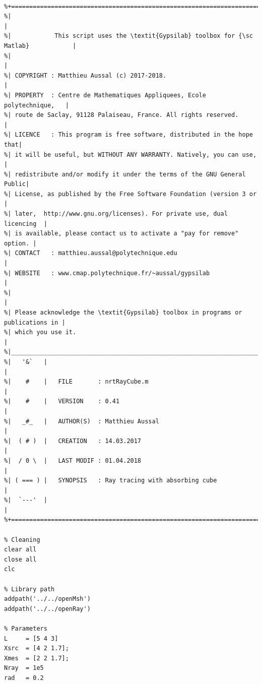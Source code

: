 \documentclass[AMA,STIX1COL]{WileyNJD-v2}
\begin{document}
\begin{lstlisting}[style=Matlab-editor,basicstyle=\footnotesize]

%+========================================================================+
%|                                                                        |
%|            This script uses the \textit{Gypsilab} toolbox for {\sc Matlab}            |
%|                                                                        |
%| COPYRIGHT : Matthieu Aussal (c) 2017-2018.                             |
%| PROPERTY  : Centre de Mathematiques Appliquees, Ecole polytechnique,   |
%| route de Saclay, 91128 Palaiseau, France. All rights reserved.         |
%| LICENCE   : This program is free software, distributed in the hope that|
%| it will be useful, but WITHOUT ANY WARRANTY. Natively, you can use,    |
%| redistribute and/or modify it under the terms of the GNU General Public|
%| License, as published by the Free Software Foundation (version 3 or    |
%| later,  http://www.gnu.org/licenses). For private use, dual licencing  |
%| is available, please contact us to activate a "pay for remove" option. |
%| CONTACT   : matthieu.aussal@polytechnique.edu                          |
%| WEBSITE   : www.cmap.polytechnique.fr/~aussal/gypsilab                 |
%|                                                                        |
%| Please acknowledge the \textit{Gypsilab} toolbox in programs or publications in |
%| which you use it.                                                      |
%|________________________________________________________________________|
%|   '&`   |                                                              |
%|    #    |   FILE       : nrtRayCube.m                                  |
%|    #    |   VERSION    : 0.41                                          |
%|   _#_   |   AUTHOR(S)  : Matthieu Aussal                               |
%|  ( # )  |   CREATION   : 14.03.2017                                    |
%|  / 0 \  |   LAST MODIF : 01.04.2018                                    |
%| ( === ) |   SYNOPSIS   : Ray tracing with absorbing cube               |
%|  `---'  |                                                              |
%+========================================================================+

% Cleaning
clear all
close all
clc

% Library path
addpath('../../openMsh')
addpath('../../openRay')

% Parameters
L     = [5 4 3]
Xsrc  = [4 2 1.7];
Xmes  = [2 2 1.7];
Nray  = 1e5
rad   = 0.2


\end{lstlisting}
\end{document}
